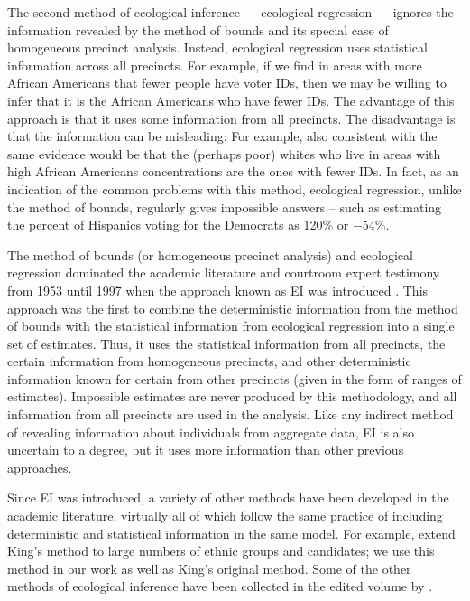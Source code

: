 \documentclass[12pt]{article}
\begin{document}
The second method of ecological inference --- ecological regression
--- ignores the information revealed by the method of bounds and its
special case of homogeneous precinct analysis. Instead, ecological
regression uses statistical information across all precincts. For
example, if we find in areas with more African Americans that fewer
people have voter IDs, then we may be willing to infer that it is the
African Americans who have fewer IDs. The advantage of this approach
is that it uses some information from all precincts. The disadvantage
is that the information can be misleading: For example, also
consistent with the same evidence would be that the (perhaps poor)
whites who live in areas with high African Americans concentrations
are the ones with fewer IDs. In fact, as an indication of the common
problems with this method, ecological regression, unlike the method of
bounds, regularly gives impossible answers -- such as estimating the
percent of Hispanics voting for the Democrats as 120\% or $-54$\%.

The method of bounds (or homogeneous precinct analysis) and ecological
regression dominated the academic literature and courtroom expert
testimony from 1953 until 1997 when the approach known as EI was
introduced \citep{King97}. This approach was the first to combine the
deterministic information from the method of bounds with the
statistical information from ecological regression into a single set
of estimates. Thus, it uses the statistical information from all
precincts, the certain information from homogeneous precincts, and
other deterministic information known for certain from other precincts
(given in the form of ranges of estimates).  Impossible estimates are
never produced by this methodology, and all information from all
precincts are used in the analysis. Like any indirect method of
revealing information about individuals from aggregate data, EI is
also uncertain to a degree, but it uses more information than other
previous approaches.

Since EI was introduced, a variety of other methods have been
developed in the academic literature, virtually all of which follow
the same practice of including deterministic and statistical
information in the same model.  For example, \citet{RosJiaKin01}
extend King's method to large numbers of ethnic groups and candidates;
we use this method in our work as well as King's original method. Some
of the other methods of ecological inference have been collected in the
edited volume by \citet{KinRosTan04b}.
\end{document}
